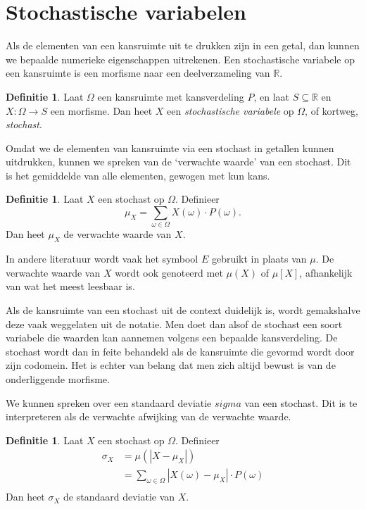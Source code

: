 \documentclass[a4paper]{book}
\theoremstyle{definition}
\newtheorem{definition}[theorem]{Definitie}
\newcommand{\reals}{\mathbb{R}}
\begin{document}
\section{Stochastische variabelen}

Als de elementen van een kansruimte uit te drukken zijn in een getal, dan kunnen we bepaalde numerieke eigenschappen uitrekenen.
Een stochastische variabele op een kansruimte is een morfisme naar een deelverzameling van $\reals$.

\begin{definition}
    Laat $\Omega$ een kansruimte met kansverdeling $P$, en laat $S \subseteq \reals$ en $X : \Omega \to S$ een morfisme.
    Dan heet $X$ een \emph{stochastische variabele} op $\Omega$, of kortweg, \emph{stochast}.
\end{definition}

Omdat we de elementen van kansruimte via een stochast in getallen kunnen uitdrukken, kunnen we spreken van de `verwachte waarde' van een stochast.
Dit is het gemiddelde van alle elementen, gewogen met kun kans.

\begin{definition}
    Laat $X$ een stochast op $\Omega$.
    Definieer \[ \mu_X = \sum_{\omega \in \Omega} X(\omega) \cdot P(\omega). \]
    Dan heet $\mu_X$ de verwachte waarde van $X$.
\end{definition}

In andere literatuur wordt vaak het symbool $E$ gebruikt in plaats van $\mu$.
De verwachte waarde van $X$ wordt ook genoteerd met $\mu(X)$ of $\mu[X]$, afhankelijk van wat het meest leesbaar is.


Als de kansruimte van een stochast uit de context duidelijk is, wordt gemakshalve deze vaak weggelaten uit de notatie.
Men doet dan alsof de stochast een soort variabele die waarden kan aannemen volgens een bepaalde kansverdeling.
De stochast wordt dan in feite behandeld als de kansruimte die gevormd wordt door zijn codomein.
Het is echter van belang dat men zich altijd bewust is van de onderliggende morfisme.


We kunnen spreken over een standaard deviatie $sigma$ van een stochast. Dit is te interpreteren als de verwachte afwijking van de verwachte waarde.

\begin{definition}
    Laat $X$ een stochast op $\Omega$.
    Definieer
    \begin{align*}
        \sigma_X &= \mu( |X - \mu_X| ) \\
                  &= \sum_{\omega \in \Omega} |X(\omega) - \mu_X| \cdot P(\omega) \\
    \end{align*}
    Dan heet $\sigma_X$ de standaard deviatie van $X$.
\end{definition}
\end{document}
